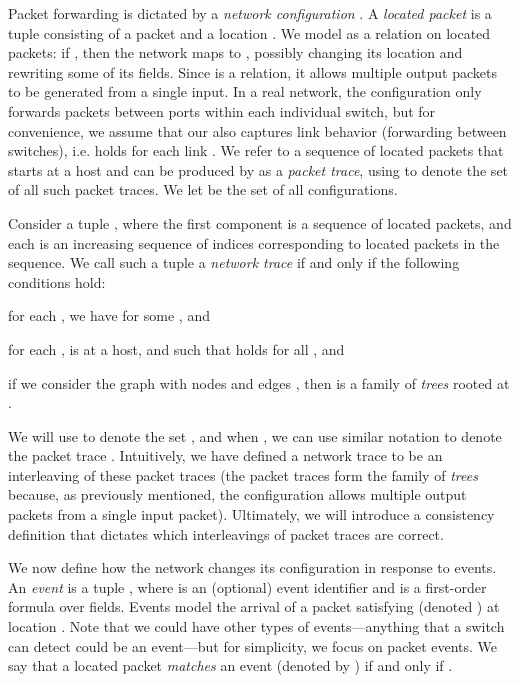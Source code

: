 \documentclass[pldi-cameraready]{sigplanconf}
\begin{document}
Packet forwarding is dictated by a {\em network
  configuration} . A {\em located packet}
 is a tuple consisting of a packet and a location
. We model  as a
relation on located packets: if , then the network maps
 to , possibly changing its location and rewriting some
of its fields.
Since  is a relation, it allows multiple output packets to be generated from a single input.
{In a real network, the configuration only forwards packets between ports within each individual switch,
but for convenience, we}
assume that our  also captures link behavior (forwarding between switches),
i.e.  holds for each link .
We refer to a sequence of located packets that starts at a host and can be
produced by  as a {\em packet trace}, 
using  to denote the set of all such packet traces.
We let  be the set of all configurations.

Consider a tuple , where the first component is a sequence of located
packets, and each  is an increasing sequence of indices corresponding to
located packets in the sequence.
We call such a tuple a {\em network trace} if and only if the following conditions hold:
\begin{compactenum}
\item for each , we have  for some , and
\item for each ,
 is at a host, and  such that  holds for all , and
\item if we consider the graph  with nodes  and
edges ,
then  is a family of {\em trees} rooted at .
\end{compactenum}
We will use  to denote
the set , and when , we
can use similar notation  to denote the packet trace .
Intuitively, we have defined a network trace to be an interleaving of
these packet traces
{(the packet traces form the family of {\em trees}
because, as previously mentioned, the configuration allows multiple
output packets from a single input packet).}
Ultimately, we will introduce a consistency definition that
dictates which interleavings of packet traces are correct.





We now define how the network changes its configuration in response to
events.  An {\em event}  is a tuple ,
where  is an (optional) event identifier and  is a first-order formula over
fields. Events model the arrival of a packet satisfying  (denoted ) at
location .  Note that we could have other types of events---anything that a switch can
detect could be an event---but for simplicity, we focus on packet
events.
We say that a located packet  {\em matches}
an event  (denoted by ) if and only if .
\end{document}
